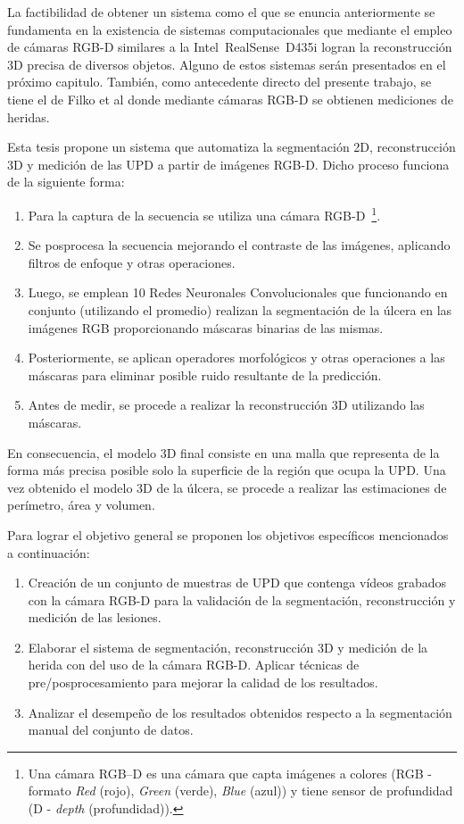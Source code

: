La factibilidad de obtener un sistema como el que se enuncia anteriormente se fundamenta en la existencia de sistemas computacionales que mediante el empleo de cámaras RGB-D similares a la Intel\textregistered~RealSense\texttrademark~D435i logran la reconstrucción 3D precisa de diversos objetos. Alguno de estos sistemas serán presentados en el próximo capitulo. También, como antecedente directo del presente trabajo, se tiene el de Filko et al \cite{filko2018wound} donde mediante cámaras RGB-D se obtienen mediciones de heridas.

Esta tesis propone un sistema que automatiza la segmentación 2D, reconstrucción 3D y medición de las UPD a partir de imágenes RGB-D. Dicho proceso funciona de la siguiente forma: 

\begin{enumerate}
	\item Para la captura de la secuencia se utiliza una cámara RGB-D~\footnote{Una cámara RGB–D es una cámara que capta imágenes a colores (RGB - formato \textit{Red} (rojo), \textit{Green} (verde), \textit{Blue} (azul)) y tiene sensor de profundidad (D - \textit{depth} (profundidad)).}.
	\item Se posprocesa la secuencia mejorando el contraste de las imágenes, aplicando filtros de enfoque y otras operaciones.
	\item Luego, se emplean 10 Redes Neuronales Convolucionales que funcionando en conjunto (utilizando el promedio) realizan la segmentación de la úlcera en las imágenes RGB proporcionando máscaras binarias de las mismas.
	\item Posteriormente, se aplican operadores morfológicos y otras operaciones a las máscaras para eliminar posible ruido resultante de la predicción.
	\item Antes de medir, se procede a realizar la reconstrucción 3D utilizando las máscaras.
\end{enumerate}

En consecuencia, el modelo 3D final consiste en una malla que representa de la forma más precisa posible solo la superficie de la región que ocupa la UPD. Una vez obtenido el modelo 3D de la úlcera, se procede a realizar las estimaciones de perímetro, área y volumen.

Para lograr el objetivo general se proponen los objetivos específicos mencionados a continuación:

\begin{enumerate}
	\item Creación de un conjunto de muestras de UPD que contenga vídeos grabados con la cámara RGB-D para la validación de la segmentación, reconstrucción y medición de las lesiones.
	\item Elaborar el sistema de segmentación, reconstrucción 3D y medición de la herida con del uso de la cámara RGB-D. Aplicar técnicas de pre/posprocesamiento para mejorar la calidad de los resultados.
	\item Analizar el desempeño de los resultados obtenidos respecto a la segmentación manual del conjunto de datos.
\end{enumerate}

